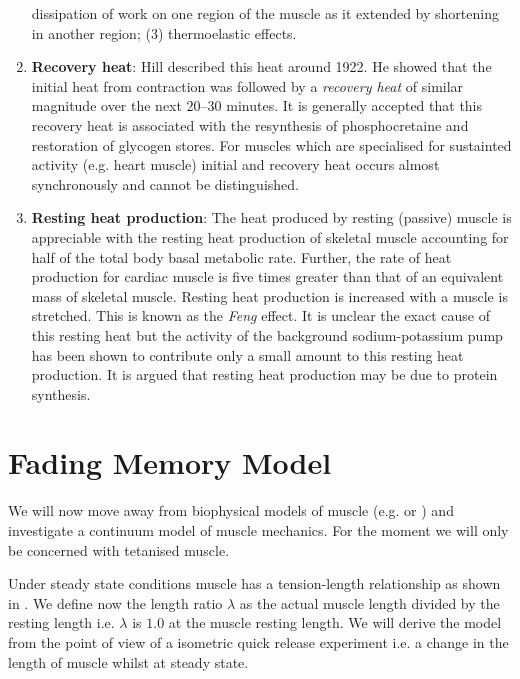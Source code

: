 \begin{enumerate}
  dissipation of work on one region of the muscle as it extended by shortening
  in another region; (3) thermoelastic effects.
\item \textbf{Recovery heat}: Hill described this heat around 1922. He showed
  that the initial heat from contraction was followed by a \emph{recovery
    heat} of similar magnitude over the next $20$--$30$ minutes. It is generally
  accepted that this recovery heat is associated with the resynthesis of
  phosphocretaine and restoration of glycogen stores. For muscles which are
  specialised for sustainted activity (e.g. heart muscle) initial and recovery
  heat occurs almost synchronously and cannot be distinguished.
\item \textbf{Resting heat production}: The heat produced by resting (passive)
  muscle is appreciable with the resting heat production of skeletal muscle
  accounting for half of the total body basal metabolic rate. Further, the
  rate of heat production for cardiac muscle is five times greater than that
  of an equivalent mass of skeletal muscle. Resting heat production is
  increased with a muscle is stretched. This is known as the \emph{Feng}
  effect. It is unclear the exact cause of this resting heat but the activity
  of the background sodium-potassium pump has been shown to contribute only a
  small amount to this resting heat production. It is argued that resting heat
  production may be due to protein synthesis.
\end{enumerate}

\section{Fading Memory Model}

We will now move away from biophysical models of muscle (e.g.
\citet{huxley:1957} or \citet{huxley:1971}) and investigate a
continuum model of muscle mechanics. For the moment we will only be concerned
with tetanised muscle.

Under steady state conditions muscle has a tension-length relationship as
shown in . We define
now the length ratio $\lambda$ as the actual muscle length divided by the
resting length i.e. $\lambda$ is $1.0$ at the muscle resting length. We will
derive the model from the point of view of a isometric quick release
experiment i.e. a change in the length of muscle whilst at steady state.

